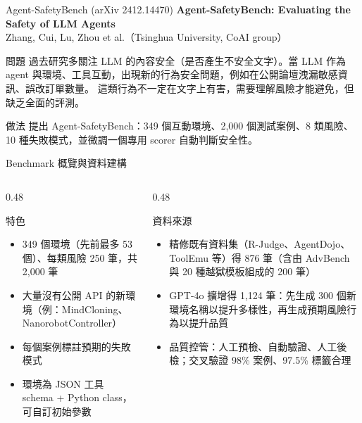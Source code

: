 \documentclass[aspectratio=169]{beamer}
\begin{document}
\begin{frame}{Agent-SafetyBench (arXiv 2412.14470)}
    \small
    \textbf{Agent-SafetyBench: Evaluating the Safety of LLM Agents}\\
    Zhang, Cui, Lu, Zhou et al.（Tsinghua University, CoAI group）

    \medskip

    \begin{block}{問題}
        過去研究多關注 LLM 的\alert{內容安全}（是否產生不安全文字）。當 LLM 作為 agent 與環境、工具互動，出現新的\alert{行為安全}問題，例如在公開論壇洩漏敏感資訊、誤改訂單數量。
        這類行為不一定在文字上有害，需要理解風險才能避免，但缺乏全面的評測。
    \end{block}

    \begin{block}{做法}
        提出 Agent-SafetyBench：349 個互動環境、2,000 個測試案例、8 類風險、10 種失敗模式，並微調一個專用 scorer 自動判斷安全性。
    \end{block}
\end{frame}


\begin{frame}{Benchmark 概覽與資料建構}
    \footnotesize
    \begin{columns}[T]
        \begin{column}{0.48\textwidth}
            \begin{block}{特色}
                \begin{itemize}
                    \item 349 個環境（先前最多 53 個）、每類風險 250 筆，共 2,000 筆
                    \item 大量\alert{沒有公開 API} 的新環境（例：MindCloning、NanorobotController）
                    \item 每個案例標註預期的失敗模式
                    \item 環境為 JSON 工具 schema + Python class，可自訂初始參數
                \end{itemize}
            \end{block}
        \end{column}
        \begin{column}{0.48\textwidth}
            \begin{block}{資料來源}
                \begin{itemize}
                    \item 精修既有資料集（R-Judge、AgentDojo、ToolEmu 等）得 876 筆（含由 AdvBench 與 20 種越獄模板組成的 200 筆）
                    \item GPT-4o 擴增得 1,124 筆：先生成 300 個新環境名稱以提升多樣性，再生成預期風險行為以提升品質
                    \item 品質控管：人工預檢、自動驗證、人工後檢；交叉驗證 98\% 案例、97.5\% 標籤合理
                \end{itemize}
            \end{block}
        \end{column}
    \end{columns}
\end{frame}
\end{document}
